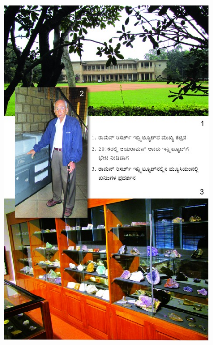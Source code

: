 \begin{figure}[!htpb]
\centering
\includegraphics[scale=2.15]{"images/001.jpg"}
\end{figure}

\vfill

